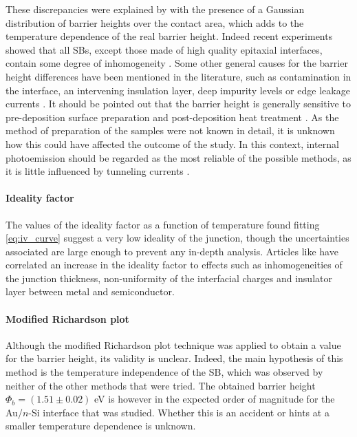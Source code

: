 These discrepancies were explained by \cite{song_difference_1986} with the presence of a Gaussian distribution of barrier heights over the contact area, which adds to the temperature dependence of the real barrier height.
Indeed recent experiments showed that all SBs, except those made of high quality epitaxial interfaces, contain some degree of inhomogeneity \cite{tung_recent_2001}.
Some other general causes for the barrier height differences have been mentioned in the literature, such as contamination in the interface, an intervening insulation layer, deep impurity levels or edge leakage currents \cite{sze_physics_2007}.
It should be pointed out that the barrier height is generally sensitive to pre-deposition surface preparation and post-deposition heat treatment \cite{sze_physics_2007}.
As the method of preparation of the samples were not known in detail, it is unknown how this could have affected the outcome of the study.
In this context, internal photoemission should be regarded as the most reliable of the possible methods, as it is little influenced by tunneling currents \cite{schroder_semiconductor_2006}.

\paragraph{Ideality factor} 
The values of the ideality factor as a function of temperature found fitting \autoref{eq:iv_curve} suggest a very low ideality of the junction, though the uncertainties associated are large enough to prevent any in-depth analysis.
Articles like \cite{dhimmar_analysis_2016} have correlated an increase in
the ideality factor to effects
such as inhomogeneities of the junction thickness, non-uniformity of
the interfacial charges and insulator layer between
metal and semiconductor.

\paragraph{Modified Richardson plot}
Although the modified Richardson plot technique was applied to obtain a value for the barrier height, its validity is unclear. Indeed, the main hypothesis of this method is the temperature independence of the SB, which was observed by neither of the other methods that were tried. The obtained barrier height $\Phi_b = (1.51 \pm 0.02)$ eV is however in the expected order of magnitude for the Au/$n$-Si interface that was studied. Whether this is an accident or hints at a smaller temperature dependence is unknown.


